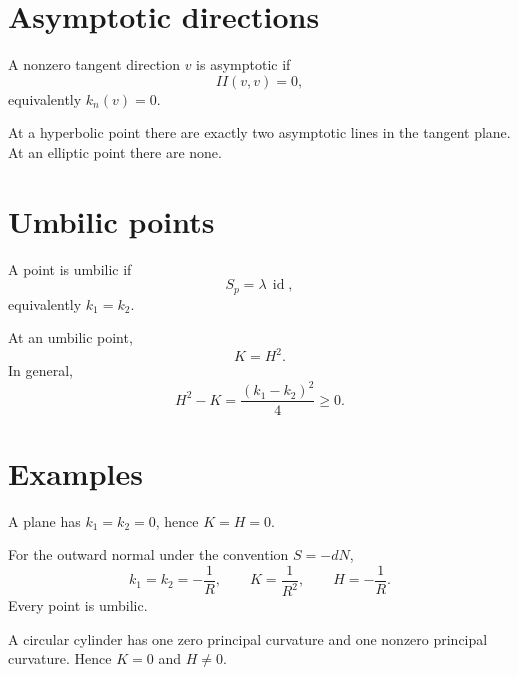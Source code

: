 \section{Asymptotic directions}

\begin{definition}\label{def:vii17-asymptotic}
A nonzero tangent direction \(v\) is asymptotic if
\[
II(v,v)=0,
\]
equivalently \(k_n(v)=0\).
\end{definition}

\begin{proposition}[Existence]\label{prop:vii17-asymptotic-existence}
At a hyperbolic point there are exactly two asymptotic lines in the tangent plane. At an elliptic point there are none.
\end{proposition}

\section{Umbilic points}

\begin{definition}[Umbilic]\label{def:vii17-umbilic}
A point is umbilic if
\[
S_p=\lambda\,\operatorname{id},
\]
equivalently \(k_1=k_2\).
\end{definition}

\begin{proposition}\label{prop:vii17-umbilic-relation}
At an umbilic point,
\[
K=H^2.
\]
In general,
\[
H^2-K=\frac{(k_1-k_2)^2}{4}\ge0.
\]
\end{proposition}

\section{Examples}

\begin{example}[Plane]\label{ex:vii17-plane}
A plane has \(k_1=k_2=0\), hence \(K=H=0\).
\end{example}

\begin{example}[Sphere]\label{ex:vii17-sphere}
For the outward normal under the convention \(S=-dN\),
\[
k_1=k_2=-\frac1R,\qquad K=\frac1{R^2},\qquad H=-\frac1R.
\]
Every point is umbilic.
\end{example}

\begin{example}[Cylinder]\label{ex:vii17-cylinder}
A circular cylinder has one zero principal curvature and one nonzero principal curvature. Hence \(K=0\) and \(H\neq0\).
\end{example}

